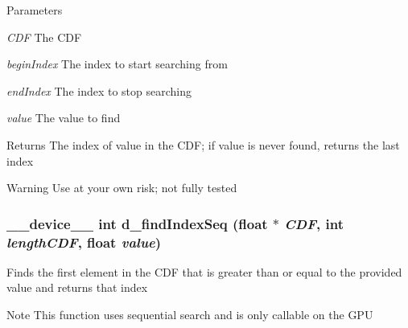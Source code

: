 \begin{DoxyParams}{Parameters}
\item[{\em CDF}]The CDF \item[{\em beginIndex}]The index to start searching from \item[{\em endIndex}]The index to stop searching \item[{\em value}]The value to find \end{DoxyParams}
\begin{DoxyReturn}{Returns}
The index of value in the CDF; if value is never found, returns the last index 
\end{DoxyReturn}
\begin{DoxyWarning}{Warning}
Use at your own risk; not fully tested 
\end{DoxyWarning}
\hypertarget{ex__particle__CUDA__naive__full_8cu_ab34812b8ea6a39f94f261d2e64ae2f0f}{
\subsubsection[{d\_\-findIndexSeq}]{\setlength{\rightskip}{0pt plus 5cm}\_\-\_\-device\_\-\_\- int d\_\-findIndexSeq (float $\ast$ {\em CDF}, \/  int {\em lengthCDF}, \/  float {\em value})}}
\label{ex__particle__CUDA__naive__full_8cu_ab34812b8ea6a39f94f261d2e64ae2f0f}
Finds the first element in the CDF that is greater than or equal to the provided value and returns that index \begin{DoxyNote}{Note}
This function uses sequential search and is only callable on the GPU 
\end{DoxyNote}


